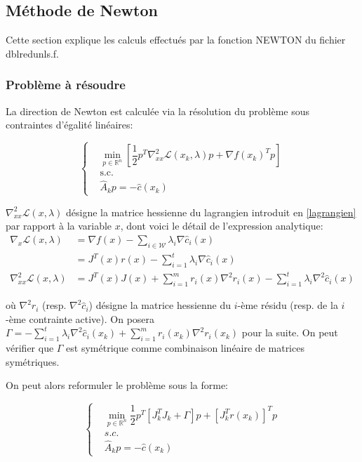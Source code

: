 \documentclass[a4paper,11pt]{article}
\newcommand{\real}{\mathbb{R}}
\newcommand{\ha}{\hat{A}}
\newcommand{\hc}{\hat{c}}
\numberwithin{equation}{section}
\begin{document}
\subsection{Méthode de Newton} \label{newtonmethod}

Cette section explique les calculs effectués par la fonction NEWTON du fichier dblredunls.f.
\subsubsection{Problème à résoudre}

La direction de Newton est calculée via la résolution du problème sous contraintes d'égalité linéaires:

$$
\left\{ \begin{aligned}
&\underset{p \in \real^{n}}{\min}\left[ \dfrac{1}{2}p^{T}\nabla_{xx}^{2}\mathcal{L}(x_{k},\lambda)p + \nabla f(x_{k})^{T}p\right]\\
&\text{s.c.}\\
&\ha_{k} p = -\hat{c}(x_{k})
\end{aligned} \right.
$$

$\nabla^{2}_{xx}\mathcal{L}(x,\lambda)$ désigne la matrice hessienne du lagrangien introduit en \ref{lagrangien} par rapport à la variable $x$, dont voici le détail de l'expression analytique:
\[
\begin{aligned}\nabla_{x}\mathcal{L}(x,\lambda)&=\nabla f(x) - \sum\limits_{i \in \mathcal{W}} \lambda_{i}\nabla \hc_{i}(x)\\
&= J^{T}(x)r(x) - \sum\limits_{i=1}^{t} \lambda_{i}\nabla \hc_{i}(x)\\
\nabla^{2}_{xx}\mathcal{L}(x,\lambda) &= J^{T}(x)J(x)+ \sum\limits_{i=1}^{m}r_i(x)\nabla^2r_i(x) - \sum\limits_{i=1}^{t}\lambda_i\nabla^2\hc_{i}(x)
\end{aligned}
\]

où $\nabla^2 r_i$ (resp. $\nabla^2 \hc_i$) désigne la matrice hessienne du $i$-ème résidu (resp. de la $i$-ème contrainte active).
On posera $\Gamma = - \sum\limits_{i=1}^{t}\lambda_i\nabla^2\hc_i(x_{k}) + \sum\limits_{i=1}^{m}r_i(x_{k})\nabla^2r_i(x_{k})$ pour la suite. On peut vérifier que $\Gamma$ est symétrique comme combinaison linéaire de matrices symétriques. 

On peut alors reformuler le problème sous la forme:


\begin{equation} \label{newtonpb}
 \left\{ \begin{aligned} &\underset{p \in \mathbb{R}^n}{\min} \dfrac{1}{2} p^T\left[J_{k}^TJ_{k} + \Gamma \right]p + \left[J_{k}^Tr(x_{k})\right]^Tp \\ 
&s.c.\\
&\ha_{k}p = -\hc(x_{k})
\end{aligned} \right.
\end{equation}
\end{document}
